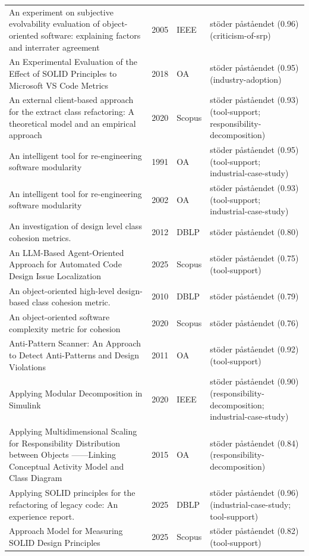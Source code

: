 \begin{longtable}{@{}%
  >{\raggedright\arraybackslash}p{}c%
  >{\raggedright\arraybackslash}p{}%
  >{\raggedright\arraybackslash}p{}@{}}
An experiment on subjective evolvability evaluation of object-oriented software: explaining factors and interrater agreement & 2005 & IEEE & stöder påståendet (0.96) (criticism-of-srp) \\
An Experimental Evaluation of the Effect of SOLID Principles to Microsoft VS Code Metrics & 2018 & OA & stöder påståendet (0.95) (industry-adoption) \\
An external client-based approach for the extract class refactoring: A theoretical model and an empirical approach & 2020 & Scopus & stöder påståendet (0.93) (tool-support; responsibility-decomposition) \\
An intelligent tool for re-engineering software modularity & 1991 & OA & stöder påståendet (0.95) (tool-support; industrial-case-study) \\
An intelligent tool for re-engineering software modularity & 2002 & OA & stöder påståendet (0.93) (tool-support; industrial-case-study) \\
An investigation of design level class cohesion metrics. & 2012 & DBLP & stöder påståendet (0.80) \\
An LLM-Based Agent-Oriented Approach for Automated Code Design Issue Localization & 2025 & Scopus & stöder påståendet (0.75) (tool-support) \\
An object-oriented high-level design-based class cohesion metric. & 2010 & DBLP & stöder påståendet (0.79) \\
An object-oriented software complexity metric for cohesion & 2020 & Scopus & stöder påståendet (0.76) \\
Anti-Pattern Scanner: An Approach to Detect Anti-Patterns and Design Violations & 2011 & OA & stöder påståendet (0.92) (tool-support) \\
Applying Modular Decomposition in Simulink & 2020 & IEEE & stöder påståendet (0.90) (responsibility-decomposition; industrial-case-study) \\
Applying Multidimensional Scaling for Responsibility Distribution between Objects ------Linking Conceptual Activity Model and Class Diagram & 2015 & OA & stöder påståendet (0.84) (responsibility-decomposition) \\
Applying SOLID principles for the refactoring of legacy code: An experience report. & 2025 & DBLP & stöder påståendet (0.96) (industrial-case-study; tool-support) \\
Approach Model for Measuring SOLID Design Principles & 2025 & Scopus & stöder påståendet (0.82) (tool-support) \\

\end{longtable}
